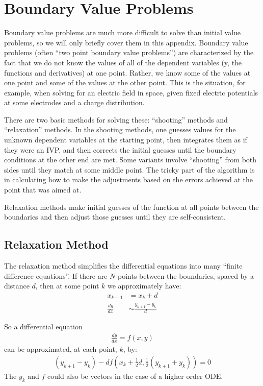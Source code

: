 \section{Boundary Value Problems}
Boundary value problems are much more difficult to solve than initial value problems, so we will only briefly cover them in this appendix. Boundary value problems (often ``two point boundary value problems'') are characterized by the fact that we do not know the values of all of the dependent variables (y, the functions and derivatives) at one point. Rather, we know some of the values at one point and some of the values at the other point. This is the situation, for example, when solving for an electric field in space, given fixed electric potentials at some electrodes and a charge distribution.

There are two basic methods for solving these: ``shooting'' methods and ``relaxation'' methods. In the shooting methods, one guesses values for the unknown dependent variables at the starting point, then integrates them as if they were an IVP, and then corrects the initial guesses until the boundary conditions at the other end are met. Some variants involve ``shooting'' from both sides until they match at some middle point. The tricky part of the algorithm is in calculating how to make the adjustments based on the errors achieved at the point that was aimed at.

Relaxation methods make initial guesses of the function at all points between the boundaries and then adjust those guesses until they are self-consistent.

\subsection{Relaxation Method}
The relaxation method simplifies the differential equations into many ``finite difference equations''. If there are $N$ points between the boundaries, spaced by a distance $d$, then at some point $k$ we approximately have:
\begin{align}
 x_{k+1}&=x_{k}+d \nonumber\\
 \frac{dy}{dx} &\sim \frac{y_{k+1}-y_k}{d} 
\end{align}

So a differential equation 
\begin{align}
\frac{dy}{dx} = f(x,y) 
\end{align}
can be approximated, at each point, $k$, by:
\begin{align}
 (y_{k+1}-y_k) - df\left(x_k+\tfrac{1}{2}d,\tfrac{1}{2}(y_{k+1}+y_k)\right) =0 
\end{align}
The $y_k$ and $f$ could also be vectors in the case of a higher order ODE. 

